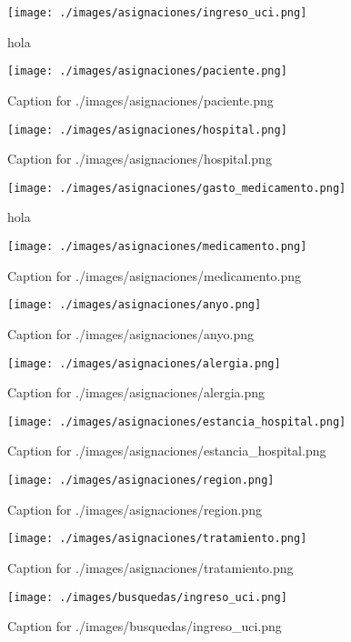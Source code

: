 \documentclass{article}
\begin{document}
\begin{figure}[H]
  \centering
  \texttt{[image: ./images/asignaciones/ingreso\_uci.png]}
  \caption{hola}
\end{figure}
\begin{figure}[H]
  \centering
  \texttt{[image: ./images/asignaciones/paciente.png]}
  \caption{Caption for ./images/asignaciones/paciente.png}
\end{figure}
\begin{figure}[H]
  \centering
  \texttt{[image: ./images/asignaciones/hospital.png]}
  \caption{Caption for ./images/asignaciones/hospital.png}
\end{figure}
\begin{figure}[H]
  \centering
  \texttt{[image: ./images/asignaciones/gasto\_medicamento.png]}
  \caption{hola}
\end{figure}
\begin{figure}[H]
  \centering
  \texttt{[image: ./images/asignaciones/medicamento.png]}
  \caption{Caption for ./images/asignaciones/medicamento.png}
\end{figure}
\begin{figure}[H]
  \centering
  \texttt{[image: ./images/asignaciones/anyo.png]}
  \caption{Caption for ./images/asignaciones/anyo.png}
\end{figure}
\begin{figure}[H]
  \centering
  \texttt{[image: ./images/asignaciones/alergia.png]}
  \caption{Caption for ./images/asignaciones/alergia.png}
\end{figure}
\begin{figure}[H]
  \centering
  \texttt{[image: ./images/asignaciones/estancia\_hospital.png]}
  \caption{Caption for ./images/asignaciones/estancia_hospital.png}
\end{figure}
\begin{figure}[H]
  \centering
  \texttt{[image: ./images/asignaciones/region.png]}
  \caption{Caption for ./images/asignaciones/region.png}
\end{figure}
\begin{figure}[H]
  \centering
  \texttt{[image: ./images/asignaciones/tratamiento.png]}
  \caption{Caption for ./images/asignaciones/tratamiento.png}
\end{figure}
\begin{figure}[H]
  \centering
  \texttt{[image: ./images/busquedas/ingreso\_uci.png]}
  \caption{Caption for ./images/busquedas/ingreso_uci.png}
\end{figure}
\end{document}
